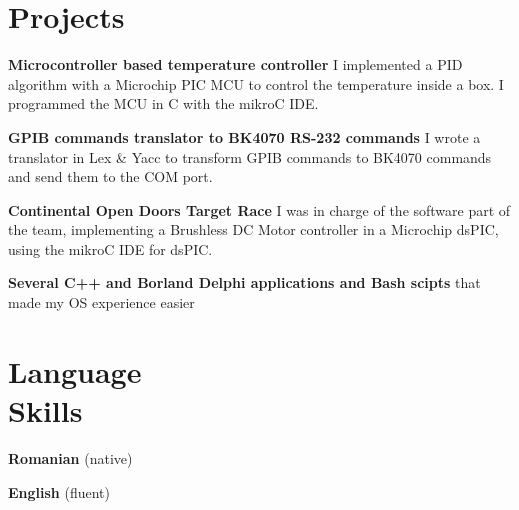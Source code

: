 \documentclass[margin,line,a4paper]{resume}
\begin{document}
\begin{resume}
\begin{description}
	\end{description}

\section{\mysidestyle Projects}
	\textbf{Microcontroller based temperature controller} I implemented a PID algorithm with a Microchip PIC MCU to control the temperature inside a box. I programmed the MCU in C with the mikroC IDE.
	
	\textbf{GPIB commands translator to BK4070 RS-232 commands} I wrote a translator in Lex \& Yacc to transform GPIB commands to BK4070 commands and send them to the COM port.
	
	\textbf{Continental Open Doors Target Race} I was in charge of the software part of the team, implementing a Brushless DC Motor controller in a Microchip dsPIC, using the mikroC IDE for dsPIC.
	
	\textbf{Several C++ and Borland Delphi applications and Bash scipts} that made my OS experience easier
	
\section{\mysidestyle Language\\Skills}
	\textbf{Romanian} (native)
	
	\textbf{English} (fluent)
\end{resume}
\end{document}

